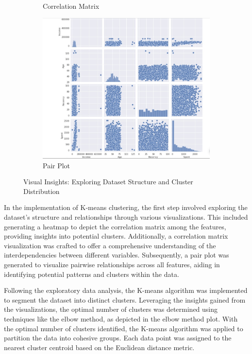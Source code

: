 \documentclass{josis}
\begin{document}
\begin{figure}
\begin{subfigure}[b]{0.45\textwidth}
        \caption{Correlation Matrix}
        \label{fig:subfig3}
    \end{subfigure}
    \hfill
    \begin{subfigure}[b]{0.45\textwidth}
        \centering
        \includegraphics[width=\textwidth]{pairplot.jpeg}
        \caption{Pair Plot}
        \label{fig:subfig4}
    \end{subfigure}
    
    \caption{Visual Insights: Exploring Dataset Structure and Cluster Distribution}
    \label{fig:mainfig2}
\end{figure}
In the implementation of K-means clustering, the first step involved exploring the dataset's structure and relationships through various visualizations. This included generating a heatmap to depict the correlation matrix among the features, providing insights into potential clusters. Additionally, a correlation matrix visualization was crafted to offer a comprehensive understanding of the interdependencies between different variables. Subsequently, a pair plot was generated to visualize pairwise relationships across all features, aiding in identifying potential patterns and clusters within the data.

Following the exploratory data analysis, the K-means algorithm was implemented to segment the dataset into distinct clusters. Leveraging the insights gained from the visualizations, the optimal number of clusters was determined using techniques like the elbow method, as depicted in the elbow method plot. With the optimal number of clusters identified, the K-means algorithm was applied to partition the data into cohesive groups. Each data point was assigned to the nearest cluster centroid based on the Euclidean distance metric.
\end{document}

